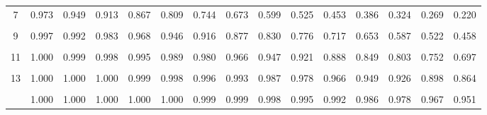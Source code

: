 \documentclass[
]{article}
\begin{document}
\begin{table}[!h]
{\begin{tabular}[t]{ccccccccccccccc}
7 & 0.973 & 0.949 & 0.913 & 0.867 & 0.809 & 0.744 & 0.673 & 0.599 & 0.525 & 0.453 & 0.386 & 0.324 & 0.269 & 0.220\\
\cellcolor{gray!10}{8} & \cellcolor{gray!10}{0.990} & \cellcolor{gray!10}{0.979} & \cellcolor{gray!10}{0.960} & \cellcolor{gray!10}{0.932} & \cellcolor{gray!10}{0.894} & \cellcolor{gray!10}{0.847} & \cellcolor{gray!10}{0.792} & \cellcolor{gray!10}{0.729} & \cellcolor{gray!10}{0.662} & \cellcolor{gray!10}{0.593} & \cellcolor{gray!10}{0.523} & \cellcolor{gray!10}{0.456} & \cellcolor{gray!10}{0.392} & \cellcolor{gray!10}{0.333}\\
9 & 0.997 & 0.992 & 0.983 & 0.968 & 0.946 & 0.916 & 0.877 & 0.830 & 0.776 & 0.717 & 0.653 & 0.587 & 0.522 & 0.458\\
\addlinespace
\cellcolor{gray!10}{10} & \cellcolor{gray!10}{0.999} & \cellcolor{gray!10}{0.997} & \cellcolor{gray!10}{0.993} & \cellcolor{gray!10}{0.986} & \cellcolor{gray!10}{0.975} & \cellcolor{gray!10}{0.957} & \cellcolor{gray!10}{0.933} & \cellcolor{gray!10}{0.901} & \cellcolor{gray!10}{0.862} & \cellcolor{gray!10}{0.816} & \cellcolor{gray!10}{0.763} & \cellcolor{gray!10}{0.706} & \cellcolor{gray!10}{0.645} & \cellcolor{gray!10}{0.583}\\
11 & 1.000 & 0.999 & 0.998 & 0.995 & 0.989 & 0.980 & 0.966 & 0.947 & 0.921 & 0.888 & 0.849 & 0.803 & 0.752 & 0.697\\
\cellcolor{gray!10}{12} & \cellcolor{gray!10}{1.000} & \cellcolor{gray!10}{1.000} & \cellcolor{gray!10}{0.999} & \cellcolor{gray!10}{0.998} & \cellcolor{gray!10}{0.996} & \cellcolor{gray!10}{0.991} & \cellcolor{gray!10}{0.984} & \cellcolor{gray!10}{0.973} & \cellcolor{gray!10}{0.957} & \cellcolor{gray!10}{0.936} & \cellcolor{gray!10}{0.909} & \cellcolor{gray!10}{0.876} & \cellcolor{gray!10}{0.836} & \cellcolor{gray!10}{0.792}\\
13 & 1.000 & 1.000 & 1.000 & 0.999 & 0.998 & 0.996 & 0.993 & 0.987 & 0.978 & 0.966 & 0.949 & 0.926 & 0.898 & 0.864\\
\cellcolor{gray!10}{14} & \cellcolor{gray!10}{1.000} & \cellcolor{gray!10}{1.000} & \cellcolor{gray!10}{1.000} & \cellcolor{gray!10}{1.000} & \cellcolor{gray!10}{0.999} & \cellcolor{gray!10}{0.999} & \cellcolor{gray!10}{0.997} & \cellcolor{gray!10}{0.994} & \cellcolor{gray!10}{0.990} & \cellcolor{gray!10}{0.983} & \cellcolor{gray!10}{0.973} & \cellcolor{gray!10}{0.959} & \cellcolor{gray!10}{0.940} & \cellcolor{gray!10}{0.917}\\
\addlinespace
15 & 1.000 & 1.000 & 1.000 & 1.000 & 1.000 & 0.999 & 0.999 & 0.998 & 0.995 & 0.992 & 0.986 & 0.978 & 0.967 & 0.951\\

\end{tabular}}
\end{table}
\end{document}
